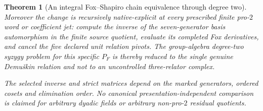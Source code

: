 \documentclass[11pt]{article}
\newtheorem{theorem}{Theorem}[section]
\theoremstyle{definition}
\begin{document}
\begin{theorem}[An integral Fox--Shapiro chain equivalence through degree two]
Moreover the
change is
\emph{recursively
native-explicit}
at every prescribed
finite pro-$2$
word or coefficient
jet: compute the
inverse of the
seven-generator
basis automorphism
in the finite
source quotient,
evaluate its
completed Fox
derivatives, and
cancel the five
declared unit
relation pivots.
The group-algebra
degree-two syzygy
problem for this
\emph{specific}
$P_F$ is thereby
reduced to the
single genuine
Demu\v{s}kin
relation and
not to an
uncontrolled
three-relator
complex.

The selected
inverse and
strict matrices
depend on the
marked generators,
ordered cosets
and elimination
order.  No
canonical
presentation-independent
comparison is
claimed for
arbitrary dyadic
fields or
arbitrary
non-pro-$2$
residual
quotients.
\end{theorem}
\end{document}
